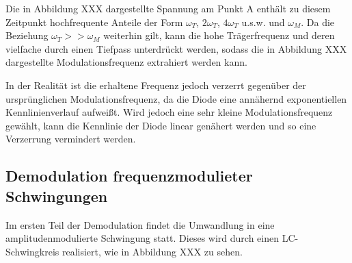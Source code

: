 
Die in Abbildung XXX dargestellte Spannung am Punkt A enthält zu diesem Zeitpunkt hochfrequente Anteile der Form $\omega_T$, $2\omega_T$, $4\omega_T$ u.s.w. und $\omega_M$. Da die Beziehung $\omega_T>>\omega_M$ weiterhin gilt, kann die hohe Trägerfrequenz und deren vielfache durch einen Tiefpass unterdrückt werden, sodass die in Abbildung XXX dargestellte Modulationsfrequenz extrahiert werden kann. 



In der Realität ist die erhaltene Frequenz jedoch verzerrt gegenüber der ursprünglichen Modulationsfrequenz, da die Diode eine annähernd exponentiellen Kennlinienverlauf aufweißt. Wird jedoch eine sehr kleine Modulationsfrequenz gewählt, kann die Kennlinie der Diode linear genähert werden und so eine Verzerrung vermindert werden.

\subsection{Demodulation frequenzmodulieter Schwingungen}
Im ersten Teil der Demodulation findet die Umwandlung  in eine amplitudenmodulierte Schwingung statt. Dieses wird durch einen LC-Schwingkreis realisiert, wie in Abbildung XXX zu sehen. 



